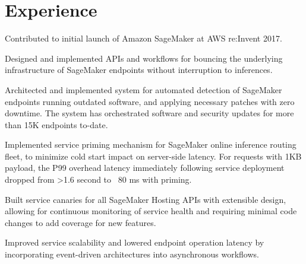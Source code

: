 \documentclass[]{deedy-resume-openfont}
\begin{document}
\begin{minipage}[t]{0.64\textwidth} 

\gap
\section{Experience}

\minigap
{}
\minigap
\vspace{\topsep} %
\begin{tightemize}
\item Contributed to initial launch of Amazon SageMaker at AWS re:Invent 2017.
\item Designed and implemented APIs and workflows for bouncing the underlying infrastructure of SageMaker endpoints without interruption to inferences.
\item Architected and implemented system for automated detection of SageMaker endpoints running outdated software, and applying necessary patches with zero downtime. The system has orchestrated software and security updates for more than 15K endpoints to-date.
\item Implemented service priming mechanism for SageMaker online inference routing fleet, to minimize cold start impact on server-side latency. For requests with 1KB payload, the P99 overhead latency immediately following service deployment dropped from >1.6 second to ~80 ms with priming.
\item Built service canaries for all SageMaker Hosting APIs with extensible design, allowing for continuous monitoring of service health and requiring minimal code changes to add coverage for new features.
\item Improved service scalability and lowered endpoint operation latency by incorporating event-driven architectures into asynchronous workflows.
\end{tightemize}
\sectionsep


\end{minipage}
\end{document}
